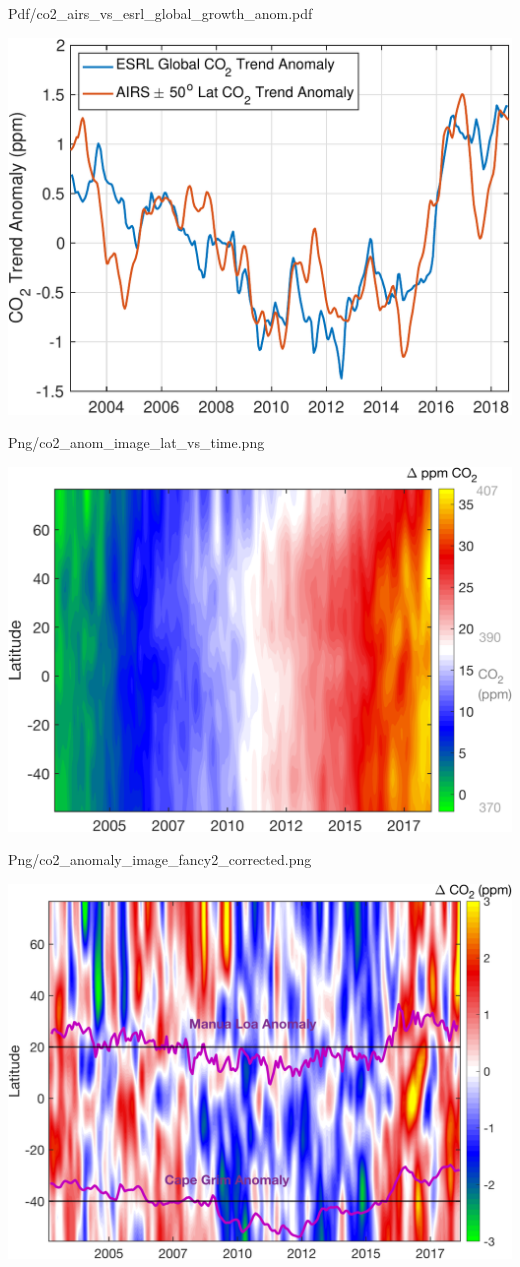 \documentclass[10pt,t]{beamer}
\begin{document}
\begin{frame}[label={sec:org7fdf2b4}]{Pdf/co2\_airs\_vs\_esrl\_global\_growth\_anom.pdf}
\begin{center}
\includegraphics[width=0.7\linewidth]{./Figs/Pdf/co2_airs_vs_esrl_global_growth_anom.pdf}
\end{center}
\end{frame}

\begin{frame}[label={sec:orge84f32f}]{Png/co2\_anom\_image\_lat\_vs\_time.png}
\begin{center}
\includegraphics[width=0.7\linewidth]{./Figs/Png/co2_anom_image_lat_vs_time.png}
\end{center}
\end{frame}

\begin{frame}[label={sec:org6a0863a}]{Png/co2\_anomaly\_image\_fancy2\_corrected.png}
\begin{center}
\includegraphics[width=0.7\linewidth]{./Figs/Png/co2_anomaly_image_fancy2_corrected.png}
\end{center}
\end{frame}
\end{document}

